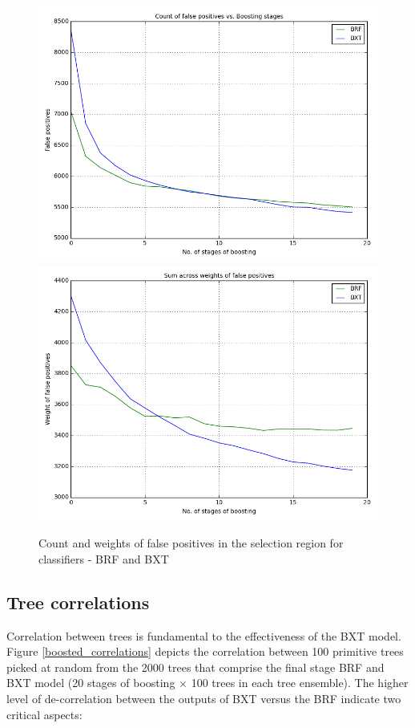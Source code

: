 \begin{figure}
\includegraphics[width=\textwidth]{images/fp_counts.png}
\includegraphics[width=\textwidth]{images/fp_weights.png}
\caption{Count and weights of false positives in the selection region for classifiers - BRF and BXT}
\label{fp_evolve}
\end{figure}

\subsection{Tree correlations}

Correlation between trees is fundamental to the effectiveness of the BXT model. Figure \ref{boosted_correlations} depicts the correlation between 100 primitive trees picked at random from 
the 2000 trees that comprise the final stage BRF and BXT model (20 stages of boosting $\times$ 100 trees in each tree ensemble). The higher level of de-correlation between the outputs of BXT versus the BRF indicate two critical aspects:

